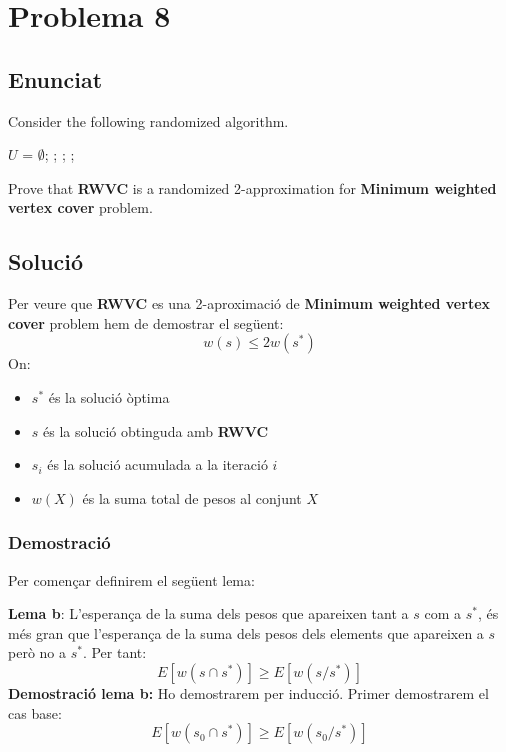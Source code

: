 \section{Problema 8}
\subsection{Enunciat}
Consider the following randomized algorithm.
\begin{algorithm}
\caption{}
\begin{algorithmic}[1]
 
\State $U$ = $\emptyset$;
    ;
    ;
    ;
\EndWhile
{}
\EndFunction
\end{algorithmic}
\end{algorithm}

Prove that \textbf{RWVC} is a randomized 2-approximation for \textbf{Minimum weighted vertex cover} problem.
\subsection{Solució}

Per veure que \textbf{RWVC} es una 2-aproximació de \textbf{Minimum weighted vertex cover} problem hem de demostrar el següent:
\[
w(s) \leq 2w(s^{*})
\]
On:
\begin{itemize}
    \item $s^{*}$ és la solució òptima
    \item $s$ és la solució obtinguda amb \textbf{RWVC}
    \item $s_i$ és la solució acumulada a la iteració $i$
    \item $w(X)$ és la suma total de pesos al conjunt $X$
\end{itemize}
\newpage
\subsubsection{Demostració}
Per començar definirem el següent lema:
\newline
\par
\textbf{Lema b}: L'esperança de la suma dels pesos que apareixen tant a $s$ com a $s^{*}$, és més gran que l'esperança de la suma dels pesos dels elements que apareixen a $s$ però no a $s^{*}$. Per tant:
\[
E[w(s \cap s^{*})] \geq E[w(s / s^{*})]
\]
\textbf{Demostració lema b:}
\newline
Ho demostrarem per inducció. Primer demostrarem el cas base: 
\[
E[w(s_0 \cap s^{*})] \geq E[w(s_0 / s^{*})]
\]


